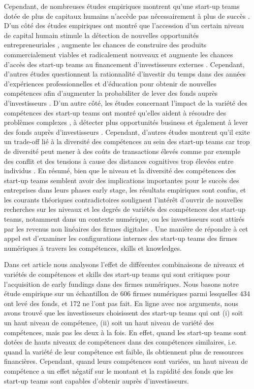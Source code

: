 \documentclass[12pt]{article}
\begin{document}
Cependant, de nombreuses études empiriques montrent qu'une start-up teams dotée de plus de capitaux humains n'accède pas nécessairement à plus de succès \citep{pierce2013too}. D'un côté des études empiriques ont montré que l'accession d'un certain niveau de capital humain stimule la détection de nouvelles opportunités entrepreneuriales \citep{shane2000promise, marvel2016human}, augmente les chances de construire des produits commercialement viables et radicalement nouveaux \citep{marvel2007technology} et augmente les chances d'accès des start-up teams au financement d'investisseurs externes \citep{beckman2007early}. Cependant, d'autres études questionnent la rationnalité d'investir du temps dans des années d'expériences professionnelles et d'éducation pour obtenir de nouvelles compétences afin d'augmenter la probabiliter de lever des fonds auprès d'investisseurs \citep{audretsch2004financing}. D'un autre côté, les études concernant l'impact de la variété des compétences des start-up teams  ont montré qu'elles aident à résoudre des problèmes complexes \citep{hong2001problem}, à détecter plus opportunités business \citep{shane2000prior} et également à lever des fonds auprès d'investisseurs \citep{ko2018signaling}. Cependant, d'autres études montrent qu'il exite un trade-off lié à la diversité des compétences au sein des start-up teams car trop de diversité peut mener à des coûts de transactions élevés comme par exemple des conflit et des tensions à cause des distances cognitives trop élevées entre individus \citep{nooteboom2007optimal}. En résumé, bien que le niveau et la diversité des compétences des start-up teams semblent avoir des implications importantes pour le succès des entreprises dans leurs phases early stage, les résultats empiriques sont confus, et les courants théoriques contradictoires soulignent l'intérêt d'ouvrir de nouvelles recherches sur les niveaux et les degrés de variétés des compétences des start-up teams, notamment dans un contexte numérique, ou les investisseurs sont attirés par les revenus non linéaires des firmes digitales \citep{nambisan2017digital}. Une manière de répondre à cet appel est d'examiner les configurations internes des start-up teams des firmes numériques à travers les compétences, skills et knowledges.

Dans cet article nous analysons l'effet de différentes combinaisons de niveaux et variétés de compétences et skills des start-up teams qui sont critiques pour l'acquisition de early fundings dans des firmes numériques. Nous basons notre étude empirique sur un échantillon de 606 firmes numériques parmi lesquelles 434 ont levé des fonds, et 172 ne l'ont pas fait. En ligne avec nos arguments, nous avons trouvé que les investisseurs choisissent des start-up teams qui ont (i) soit un haut niveau de compétence, (ii) soit un haut niveau de variété des compétences, mais pas les deux à la fois. En effet, quand les start-up teams sont dotées de hauts niveaux de compétences dans des compétences similaires, i.e. quand la variété de leur compétence est faible, ils obtiennent plus de ressources financières. Cependant, quand leurs compétences sont variées, un haut niveau de compétence a un effet négatif sur le montant et la rapidité des fonds que les start-up teams sont capables d'obtenir auprès d'investisseurs.
\end{document}
